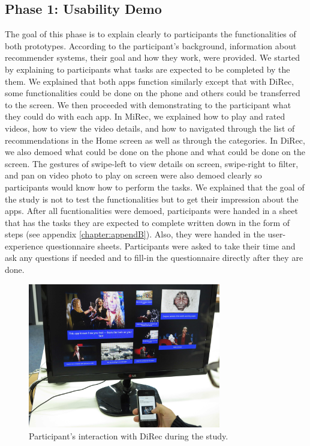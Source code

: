 \subsection{Phase 1: Usability Demo}
The goal of this phase is to explain clearly to participants the functionalities
of both prototypes. According to the participant’s background, information about
recommender systems, their goal and how they work, were provided. We started by
explaining to participants what tasks are expected to be completed by the them.
We explained that both apps function similarly except that with DiRec, some
functionalities could be done on the phone and others could be transferred to
the screen. We then proceeded with demonstrating to the participant what they
could do with each app. In MiRec, we explained how to play and rated videos, how
to view the video details, and how to navigated through the list of
recommendations in the Home screen as well as through the categories. In DiRec,
we also demoed what could be done on the phone and what could be done on the
screen. The gestures of swipe-left to view details on screen, swipe-right to
filter, and pan on video photo to play on screen were also demoed clearly so
participants would know how to perform the tasks. We explained that the goal of
the study is not to test the functionalities but to get their impression about
the apps. After all fucntionalities were demoed, participants were handed in a
sheet that has the tasks they are expected to complete written down in the form
of steps (see appendix \ref{chapter:appendB}). Also, they were handed in the
user-experience questionnaire sheets. Participants were asked to take their time and ask any questions if needed and to fill-in the questionnaire
directly after they are done.
\begin{figure}[t]
\includegraphics[width=0.75\textwidth, center, center]{figures/IMG_6806}
\caption{Participant's interaction with DiRec during the study.}
\label{fig:figure51}
\end{figure}
